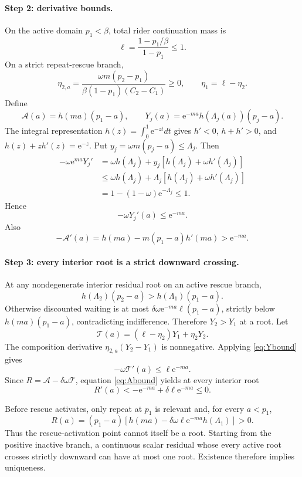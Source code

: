 \documentclass[11pt]{article}
\theoremstyle{definition}
\theoremstyle{remark}
\newcommand{\e}{\mathrm e}
\begin{document}
\paragraph{Step 2: derivative bounds.}
On the active domain $p_1<\beta$, total rider continuation mass is
\[
\ell=\frac{1-p_1/\beta}{1-p_1}\le1.
\]
On a strict repeat-rescue branch,
\[
\eta_{2,a}=
\frac{\omega m(p_2-p_1)}
{\beta(1-p_1)(C_2-C_1)}\ge0,
\qquad \eta_1=\ell-\eta_2.
\]
Define
\[
\mathcal A(a)=h(ma)(p_1-a),
\qquad
Y_j(a)=\e^{-ma}h(\Lambda_j(a))(p_j-a).
\]
The integral representation $h(z)=\int_0^1\e^{-zt}dt$ gives
$h'<0$, $h+h'>0$, and $h(z)+zh'(z)=\e^{-z}$.  Put
$y_j=\omega m(p_j-a)\le\Lambda_j$.  Then
\begin{align*}
-\omega\e^{ma}Y_j'
&=\omega h(\Lambda_j)
+y_j[h(\Lambda_j)+\omega h'(\Lambda_j)]\\
&\le \omega h(\Lambda_j)
+\Lambda_j[h(\Lambda_j)+\omega h'(\Lambda_j)]\\
&=1-(1-\omega)\e^{-\Lambda_j}\le1.
\end{align*}
Hence
\begin{equation}
-\omega Y_j'(a)\le\e^{-ma}.
\label{eq:Ybound}
\end{equation}
Also
\begin{equation}
-\mathcal A'(a)
=h(ma)-m(p_1-a)h'(ma)>\e^{-ma}.
\label{eq:Abound}
\end{equation}

\paragraph{Step 3: every interior root is a strict downward crossing.}
At any nondegenerate interior residual root on an active rescue branch,
\[
h(\Lambda_2)(p_2-a)>h(\Lambda_1)(p_1-a).
\]
Otherwise discounted waiting is at most
$\delta\omega\e^{-ma}\ell(p_1-a)$, strictly below
$h(ma)(p_1-a)$, contradicting indifference.  Therefore $Y_2>Y_1$ at a root.
Let
\[
\mathcal T(a)=(\ell-\eta_2)Y_1+\eta_2Y_2.
\]
The composition derivative $\eta_{2,a}(Y_2-Y_1)$ is nonnegative.  Applying
\eqref{eq:Ybound} gives
\[
-\omega\mathcal T'(a)\le\ell\e^{-ma}.
\]
Since $R=\mathcal A-\delta\omega\mathcal T$, equation
\eqref{eq:Abound} yields at every interior root
\[
R'(a)<-\e^{-ma}+\delta\ell\e^{-ma}\le0.
\]

Before rescue activates, only repeat at $p_1$ is relevant and, for every
$a<p_1$,
\[
R(a)=(p_1-a)
\left[h(ma)-\delta\omega\ell\e^{-ma}h(\Lambda_1)\right]>0.
\]
Thus the rescue-activation point cannot itself be a root.  Starting from the
positive inactive branch, a continuous scalar residual whose every active
root crosses strictly downward can have at most one root.  Existence therefore
implies uniqueness.
\end{document}
